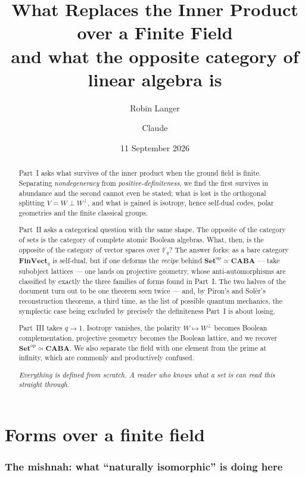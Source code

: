 \documentclass[11pt,a4paper]{article}
\title{\bfseries What Replaces the Inner Product over a Finite Field\\[0.4em]
\large and what the opposite category of linear algebra is}
\author{Robin Langer \and Claude}
\date{11 September 2026}
\theoremstyle{definition}
\theoremstyle{remark}
\newcommand{\FF}{\mathbb{F}}
\newcommand{\perpp}{^{\perp}}
\newcommand{\cat}[1]{\mathbf{#1}}
\newcommand{\Set}{\cat{Set}}
\newcommand{\CABA}{\cat{CABA}}
\newcommand{\FinVect}{\cat{FinVect}}
\newcommand{\op}{\mathrm{op}}
\begin{document}
\maketitle

\begin{abstract}
Part~I asks what survives of the inner product when the ground field is finite. Separating
\emph{nondegeneracy} from \emph{positive-definiteness}, we find the first survives in
abundance and the second cannot even be stated; what is lost is the orthogonal splitting
$V = W \perp W\perpp$, and what is gained is isotropy, hence self-dual codes, polar
geometries and the finite classical groups.

Part~II asks a categorical question with the same shape. The opposite of the category of
sets is the category of complete atomic Boolean algebras. What, then, is the opposite of
the category of vector spaces over $\FF_q$? The answer forks: as a bare category
$\FinVect_q$ is self-dual, but if one deforms the \emph{recipe} behind $\Set^{\op} \simeq
\CABA$ --- take subobject lattices --- one lands on projective geometry, whose
anti-automorphisms are classified by exactly the three families of forms found in Part~I.
The two halves of the document turn out to be one theorem seen twice --- and, by
Piron's and Sol\`er's reconstruction theorems, a third time, as the list of possible quantum
mechanics, the symplectic case being excluded by precisely the definiteness Part~I is about
losing.

Part~III takes $q \to 1$. Isotropy vanishes, the polarity $W \mapsto W\perpp$ becomes
Boolean complementation, projective geometry becomes the Boolean lattice, and we recover
$\Set^{\op} \simeq \CABA$. We also separate the field with one element from the prime at
infinity, which are commonly and productively confused.

\medskip
\noindent\emph{Everything is defined from scratch. A reader who knows what a set is can
read this straight through.}
\end{abstract}

\tableofcontents

\newpage
\part{Forms over a finite field}

\section{The mishnah: what ``naturally isomorphic'' is doing here}
\end{document}
